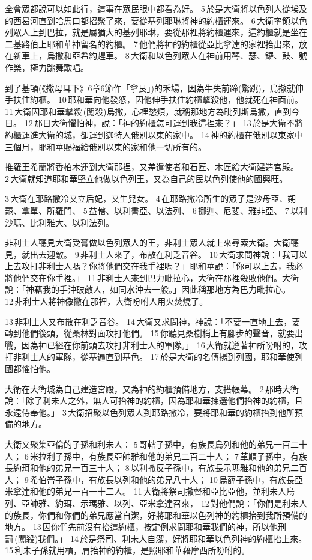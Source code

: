 全會眾都說可以如此行，這事在眾民眼中都看為好。 5 於是大衛將以色列人從埃及的西曷河直到哈馬口都招聚了來，要從基列耶琳將神的約櫃運來。 6 大衛率領以色列眾人上到巴拉，就是屬猶大的基列耶琳，要從那裡將約櫃運來，這約櫃就是坐在二基路伯上耶和華神留名的約櫃。 7 他們將神的約櫃從亞比拿達的家裡抬出來，放在新車上，烏撒和亞希約趕車。 8 大衛和以色列眾人在神前用琴、瑟、鑼、鼓、號作樂，極力跳舞歌唱。

到了基頓(《撒母耳下》6章6節作「拿艮」)的禾場，因為牛失前蹄(驚跳)，烏撒就伸手扶住約櫃。 10 耶和華向他發怒，因他伸手扶住約櫃擊殺他，他就死在神面前。 11 大衛因耶和華擊殺 (闖殺)烏撒，心裡愁煩，就稱那地方為毗列斯烏撒，直到今日。 12 那日大衛懼怕神，說：「神的約櫃怎可運到我這裡來？」 13 於是大衛不將約櫃運進大衛的城，卻運到迦特人俄別以東的家中。 14 神的約櫃在俄別以東家中三個月，耶和華賜福給俄別以東的家和他一切所有的。

推羅王希蘭將香柏木運到大衛那裡，又差遣使者和石匠、木匠給大衛建造宮殿。 2 大衛就知道耶和華堅立他做以色列王，又為自己的民以色列使他的國興旺。

3 大衛在耶路撒冷又立后妃，又生兒女。 4 在耶路撒冷所生的眾子是沙母亞、朔罷、拿單、所羅門、 5 益轄、以利書亞、以法列、 6 挪迦、尼斐、雅非亞、 7 以利沙瑪、比利雅大、以利法列。


非利士人聽見大衛受膏做以色列眾人的王，非利士眾人就上來尋索大衛。大衛聽見，就出去迎敵。 9 非利士人來了，布散在利乏音谷。 10 大衛求問神說：「我可以上去攻打非利士人嗎？你將他們交在我手裡嗎？」耶和華說：「你可以上去，我必將他們交在你手裡。」 11 非利士人來到巴力毗拉心，大衛在那裡殺敗他們。大衛說：「神藉我的手沖破敵人，如同水沖去一般。」因此稱那地方為巴力毗拉心。 12 非利士人將神像撇在那裡，大衛吩咐人用火焚燒了。

13 非利士人又布散在利乏音谷。 14 大衛又求問神，神說：「不要一直地上去，要轉到他們後頭，從桑林對面攻打他們。 15 你聽見桑樹梢上有腳步的聲音，就要出戰，因為神已經在你前頭去攻打非利士人的軍隊。」 16 大衛就遵著神所吩咐的，攻打非利士人的軍隊，從基遍直到基色。 17 於是大衛的名傳揚到列國，耶和華使列國都懼怕他。

大衛在大衛城為自己建造宮殿，又為神的約櫃預備地方，支搭帳幕。 2 那時大衛說：「除了利未人之外，無人可抬神的約櫃，因為耶和華揀選他們抬神的約櫃，且永遠侍奉他。」 3 大衛招聚以色列眾人到耶路撒冷，要將耶和華的約櫃抬到他所預備的地方。

大衛又聚集亞倫的子孫和利未人： 5 哥轄子孫中，有族長烏列和他的弟兄一百二十人； 6 米拉利子孫中，有族長亞帥雅和他的弟兄二百二十人； 7 革順子孫中，有族長約珥和他的弟兄一百三十人； 8 以利撒反子孫中，有族長示瑪雅和他的弟兄二百人； 9 希伯崙子孫中，有族長以列和他的弟兄八十人； 10 烏薛子孫中，有族長亞米拿達和他的弟兄一百一十二人。 11 大衛將祭司撒督和亞比亞他，並利未人烏列、亞帥雅、約珥、示瑪雅、以列、亞米拿達召來， 12 對他們說：「你們是利未人的族長，你們和你們的弟兄應當自潔，好將耶和華以色列神的約櫃抬到我所預備的地方。 13 因你們先前沒有抬這約櫃，按定例求問耶和華我們的神，所以他刑罰 (闖殺)我們。」 14 於是祭司、利未人自潔，好將耶和華以色列神的約櫃抬上來。 15 利未子孫就用槓，肩抬神的約櫃，是照耶和華藉摩西所吩咐的。


